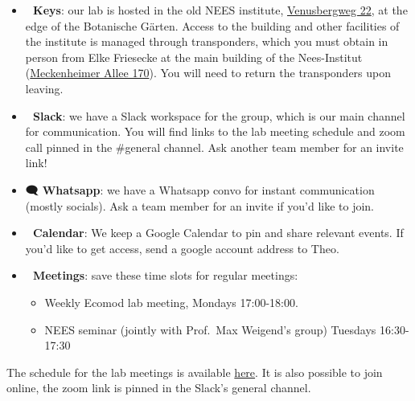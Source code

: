 \documentclass[
]{book}
\providecommand{\tightlist}{%
  \setlength{\itemsep}{0pt}\setlength{\parskip}{0pt}}
\begin{document}
\begin{itemize}
\item
  \textbf{🔑 Keys}: our lab is hosted in the old NEES institute,
  \href{https://www.openstreetmap.org/way/406460211}{Venusbergweg 22}, at the
  edge of the Botanische Gärten. Access to the building and other
  facilities of the institute is managed through transponders, which you
  must obtain in person from Elke Friesecke at the main building of the
  Nees-Institut (\href{https://www.openstreetmap.org/way/149556476}{Meckenheimer Allee
  170}). You will need to
  return the transponders upon leaving.
\item
  \textbf{🔘 Slack}: we have a Slack workspace for the group, which is our
  main channel for communication. You will find links to the lab meeting
  schedule and zoom call pinned in the \#general channel. Ask another
  team member for an invite link!
\item
  \textbf{🗨️ Whatsapp}: we have a Whatsapp convo for instant communication
  (mostly socials). Ask a team member for an invite if you'd like to
  join.
\item
  \textbf{📆 Calendar}: We keep a Google Calendar to pin and share relevant
  events. If you'd like to get access, send a google account address to
  Theo.
\item
  \textbf{👥 Meetings}: save these time slots for regular meetings:

  \begin{itemize}
  \tightlist
  \item
    Weekly Ecomod lab meeting, Mondays 17:00-18:00.
  \item
    NEES seminar (jointly with Prof.~Max Weigend's group) Tuesdays
    16:30-17:30
  \end{itemize}
\end{itemize}

The schedule for the lab meetings is available
\href{https://docs.google.com/document/d/1p0EdFmez05UcZ4QUoacWM9PfAQuAKpg7XM1HtXeEdRU/edit?usp=sharing}{here}.
It is also possible to join online, the zoom link is pinned in the
Slack's general channel.
\end{document}
